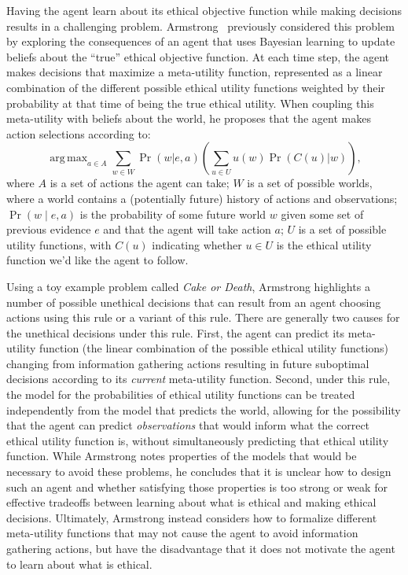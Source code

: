 \documentclass[11pt]{article}
\DeclareMathOperator*{\argmax}{arg\,max}
\begin{document}
Having the agent learn about its ethical objective function while making decisions results in a challenging problem. Armstrong~ previously considered this problem by exploring the consequences of an agent that uses Bayesian learning to update beliefs about the ``true'' ethical objective function. At each time step, the agent makes decisions that maximize a meta-utility function, represented as a linear combination of the different possible ethical utility functions weighted by their probability at that time of being the true ethical utility. When coupling this meta-utility with beliefs about the world, he proposes that the agent makes action selections according to:
\begin{equation}
\label{eq:armstrong}
\argmax_{a \in A} \sum_{w \in W} \Pr(w | e, a) \left( \sum_{u \in U} u(w) \Pr(C(u)|w) \right),
\end{equation}
where $A$ is a set of actions the agent can take; $W$ is a set of possible worlds, where a world contains a (potentially future) history of actions and observations; $\Pr(w \mid e, a)$ is the probability of some future world $w$ given some set of previous evidence $e$ and that the agent will take action $a$; $U$ is a set of possible utility functions, with $C(u)$ indicating whether $u \in U$ is the ethical utility function we'd like the agent to follow.

Using a toy example problem called {\em Cake or Death}, Armstrong highlights a number of possible unethical decisions that can result from an agent choosing actions using this rule or a variant of this rule. There are generally two causes for the unethical decisions under this rule. First, the agent can predict its meta-utility function (the linear combination of the possible ethical utility functions) changing from information gathering actions resulting in future suboptimal decisions according to its {\em current} meta-utility function. Second, under this rule, the model for the probabilities of ethical utility functions can be treated independently from the model that predicts the world, allowing for the possibility that the agent can predict {\em observations} that would inform what the correct ethical utility function is, without simultaneously predicting that ethical utility function. While Armstrong notes properties of the models that would be necessary to avoid these problems, he concludes that it is unclear how to design such an agent and whether satisfying those properties is too strong or weak for effective tradeoffs between learning about what is ethical and making ethical decisions. Ultimately, Armstrong instead considers how to formalize different meta-utility functions that may not cause the agent to avoid information gathering actions, but have the disadvantage that it does not motivate the agent to learn about what is ethical.
\end{document}
